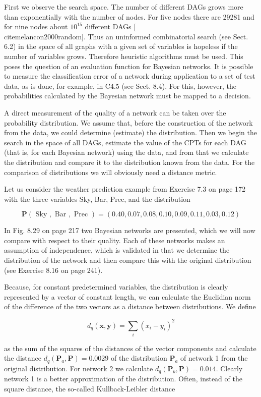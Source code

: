 \documentclass[10pt]{book}
\begin{document}
First we observe the search space. The number of different DAGs grows more than exponentially with the number of nodes. For five nodes there are 29281 and for nine nodes about $10^{15}$ different DAGs [\\cite{melancon2000random}]. Thus an uninformed combinatorial search (see Sect. 6.2) in the space of all graphs with a given set of variables is hopeless if the number of variables grows. Therefore heuristic algorithms must be used. This poses the question of an evaluation function for Bayesian networks. It is possible to measure the classification error of a network during application to a set of test data, as is done, for example, in C4.5 (see Sect. 8.4). For this, however, the probabilities calculated by the Bayesian network must be mapped to a decision.

A direct measurement of the quality of a network can be taken over the probability distribution. We assume that, before the construction of the network from the data, we could determine (estimate) the distribution. Then we begin the search in the space of all DAGs, estimate the value of the CPTs for each DAG (that is, for each Bayesian network) using the data, and from that we calculate the distribution and compare it to the distribution known from the data. For the comparison of distributions we will obviously need a distance metric.

Let us consider the weather prediction example from Exercise 7.3 on page 172 with the three variables Sky, Bar, Prec, and the distribution

$$
\boldsymbol{P}(\text { Sky }, \text { Bar }, \text { Prec })=(0.40,0.07,0.08,0.10,0.09,0.11,0.03,0.12)
$$

In Fig. 8.29 on page 217 two Bayesian networks are presented, which we will now compare with respect to their quality. Each of these networks makes an assumption of independence, which is validated in that we determine the distribution of the network and then compare this with the original distribution (see Exercise 8.16 on page 241).

Because, for constant predetermined variables, the distribution is clearly represented by a vector of constant length, we can calculate the Euclidian norm of the difference of the two vectors as a distance between distributions. We define

$$
d_{q}(\boldsymbol{x}, \boldsymbol{y})=\sum_{i}\left(x_{i}-y_{i}\right)^{2}
$$

as the sum of the squares of the distances of the vector components and calculate the distance $d_{q}\left(\boldsymbol{P}_{a}, \boldsymbol{P}\right)=0.0029$ of the distribution $\boldsymbol{P}_{a}$ of network 1 from the original distribution. For network 2 we calculate $d_{q}\left(\boldsymbol{P}_{b}, \boldsymbol{P}\right)=0.014$. Clearly network 1 is a better approximation of the distribution. Often, instead of the square distance, the so-called Kullback-Leibler distance
\end{document}
